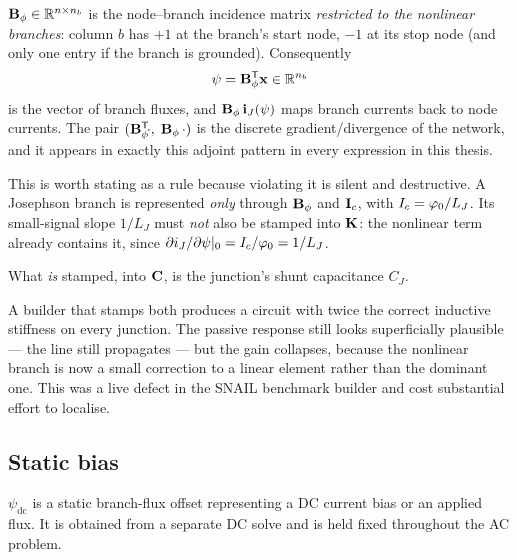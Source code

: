 $\mathbf{B}_{\phi} \in \mathbb{R}^{n\times n_b}$ is the node--branch incidence matrix
\emph{restricted to the nonlinear branches}: column $b$ has $+1$ at the branch's
start node, $-1$ at its stop node (and only one entry if the branch is grounded).
Consequently
\begin{equation}
  \psi = \mathbf{B}_{\phi}^{\mathsf T}\mathbf{x} \in \mathbb{R}^{n_b}
\end{equation}
is the vector of branch fluxes, and $\mathbf{B}_{\phi}\,\mathbf{i}_{J}(\psi)$ maps branch currents back
to node currents. The pair
$(\mathbf{B}_{\phi}^{\mathsf T}\!\cdot,\;\mathbf{B}_{\phi}\,\cdot)$ is the discrete gradient/divergence
of the network, and it appears in exactly this adjoint pattern in every
expression in this thesis.

\begin{implnote}
This is worth stating as a rule because violating it is silent and destructive.
A Josephson branch is represented \emph{only} through $\mathbf{B}_{\phi}$ and $\mathbf{I}_{c}$, with
$I_c = \varphi_{0} / L_J$. Its small-signal slope $1/L_J$ must \emph{not} also be
stamped into $\mathbf{K}$: the nonlinear term already contains it, since
$\partial i_J/\partial\psi|_{0} = I_c/\varphi_{0} = 1/L_J$.

What \emph{is} stamped, into $\mathbf{C}$, is the junction's shunt capacitance $C_J$.

A builder that stamps both produces a circuit with twice the correct inductive
stiffness on every junction. The passive response still looks superficially
plausible --- the line still propagates --- but the gain collapses, because the
nonlinear branch is now a small correction to a linear element rather than the
dominant one. This was a live defect in the SNAIL benchmark builder and cost
substantial effort to localise.
\end{implnote}

\subsection{Static bias}

$\psi_{\mathrm{dc}}$ is a static branch-flux offset representing a DC current
bias or an applied flux. It is obtained from a separate DC solve and is held
fixed throughout the AC problem.

